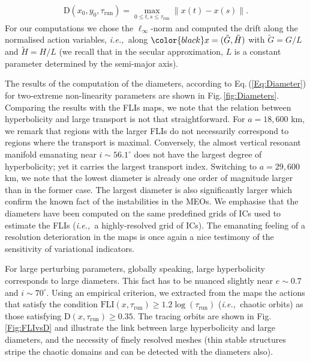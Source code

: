 \documentclass{amsart}
\theoremstyle{definition}
\theoremstyle{remark}
\numberwithin{equation}{section}
\newcommand{\norm}[1]{\left\lVert#1\right\rVert}
\newcommand{\ie}{\textit{i.e.,\ }}
\begin{document}
\begin{align}\label{Eq:Diameter}
	\textrm{D}(x_{0},y_{0},\tau_{\textrm{run}}) = \max_{0\le t,s \le \tau_{\textrm{run}}} \norm{x(t)-x(s)}.
\end{align}
For our computations we chose the $\ell_{\infty}$-norm and computed the drift along the normalised action variables, \ie along ${\color{black}x=(\tilde{G},\tilde{H})}$ with 
$\tilde{G}=G/L$ and
$\tilde{H}=H/L$ (we recall that in the secular approximation, $L$ is a constant parameter determined by the semi-major axis). 

The results of the computation of the diameters, according to Eq.\,(\ref{Eq:Diameter}) for two-extreme non-linearity parameters are shown in Fig.\,\ref{fig:Diameters}. 
Comparing the results with the FLIs maps, we note that the relation between hyperbolicity and 
large transport is not that straightforward. For $a=18,600$ km, we remark that regions with the 
larger FLIs do not necessarily correspond to regions where the transport is maximal. 
Conversely, the almost vertical resonant manifold emanating near $i \sim 56.1^{\circ}$ does not 
have the largest degree of hyperbolicity; yet it carries the largest transport index. Switching to 
$a=29,600$ km, we note that the lowest diameter is already one order of magnitude larger than 
in the former case. The largest diameter is also significantly larger which confirm the known fact 
of the instabilities in the MEOs.  We emphasise that the diameters have been computed on the 
same predefined grids of ICs used to estimate the FLIs (\ie a highly-resolved grid of ICs). The 
emanating feeling of a resolution deterioration in the maps is once again a nice testimony of the 
sensitivity of variational indicators.

For large perturbing parameters,  globally speaking, large hyperbolicity corresponds {\color{black}to} large 
diameters. This fact has  to be nuanced slightly near $e\sim0.7$ and $i \sim 70^{\circ}$. Using 
an empirical criterion, we extracted from the maps the actions {\color{black}that} satisfy the condition $
\textrm{FLI}(x,\tau_{\textrm{run}}) \ge 1.2 \log (\tau_{\textrm{run}})$ (\ie chaotic orbits) as those 
satisfying $\textrm{D}(x,\tau_{\textrm{run}}) \ge 0.35$. The tracing {\color{black}orbits} are shown in Fig.\,\ref{Fig:FLIvsD} and illustrate the link between large hyperbolicity and large diameters, and the 
necessity of {\color{black}finely} resolved meshes (thin stable structures stripe the chaotic domains and can be 
detected with the diameters also).
    
\end{document}
